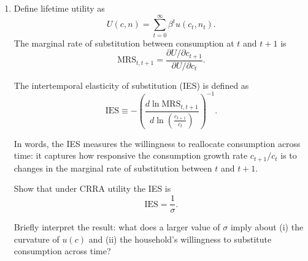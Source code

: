 \documentclass[dvipsnames,11pt]{article}
\begin{document}
\begin{enumerate}
\begin{solution}
Using the approximation above:
            \[
            \pi \approx \frac{1}{2}RRA(\bar c) \varepsilon^2=\frac{1}{2}\sigma \varepsilon^2.
            \]

The coefficient of relative risk aversion $RRA(c)$ constant under CRRA preferences means that household attitudes toward risk do not depend on consumption levels. The willingness to pay to avoid a fixed percentage consumption gamble is independent of the level of consumption. 

This is a strong behavioral assumption. Intuitively, a person with ten million dollars is (much) less willing to pay a fixed cost to avoid a gamble to win or lose one dollar than a person with ten dollars.
        
            
        
                
            \end{solution}

\bigskip

            \item Define lifetime utility as
            \[
            U(c,n)=\sum_{t=0}^{\infty}\beta^t u(c_t,n_t).
            \]
            The marginal rate of substitution between consumption at $t$ and $t+1$ is
            \[
            \text{MRS}_{t,t+1}
            =
            \frac{\partial U/\partial c_{t+1}}{\partial U/\partial c_t}.
            \]
            
            The intertemporal elasticity of substitution (IES) is defined as
            \[
            \text{IES}
            \equiv
            -
            \left(
            \frac{d\ln \text{MRS}_{t,t+1}}
                 {d\ln\!\left(\frac{c_{t+1}}{c_t}\right)}
            \right)^{-1}.
            \]
            
            In words, the IES measures the willingness to reallocate consumption across time: it captures how responsive the consumption growth rate $c_{t+1}/c_t$ is to changes in the marginal rate of substitution between $t$ and $t+1$.
            
            Show that under CRRA utility the IES is
            \[
            \text{IES}=\frac{1}{\sigma}.
            \]
            
            Briefly interpret the result: what does a larger value of $\sigma$ imply about (i) the curvature of $u(c)$ and (ii) the household’s willingness to substitute consumption across time?

            \begin{solution}


\end{solution}
\end{enumerate}
\end{document}
